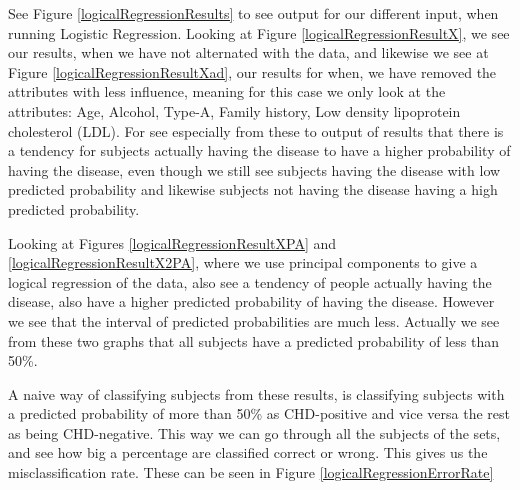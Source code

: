 See Figure \ref{logicalRegressionResults} to see output for our different input, when running Logistic Regression. Looking at Figure \ref{logicalRegressionResultX}, we see our results, when we have not alternated with the data, and likewise we see at Figure \ref{logicalRegressionResultXad}, our results for when, we have removed the attributes with less influence, meaning for this case we only look at the attributes: Age, Alcohol, Type-A, Family history, Low density lipoprotein cholesterol (LDL). For see especially from these to output of results that there is a tendency for subjects actually having the disease to have a higher probability of having the disease, even though we still see subjects having the disease with low predicted probability and likewise subjects not having the disease having a high predicted probability.

Looking at Figures \ref{logicalRegressionResultXPA} and \ref{logicalRegressionResultX2PA}, where we use principal components to give a logical regression of the data, also see a tendency of people actually having the disease, also have a higher predicted probability of having the disease. However we see that the interval of predicted probabilities are much less. Actually we see from these two graphs that all subjects have a predicted probability of less than 50\%.

A naive way of classifying subjects from these results, is classifying subjects with a predicted probability of more than 50\% as CHD-positive and vice versa the rest as being CHD-negative. This way we can go through all the subjects of the sets, and see how big a percentage are classified correct or wrong. This gives us the misclassification rate. These can be seen in Figure \ref{logicalRegressionErrorRate}

